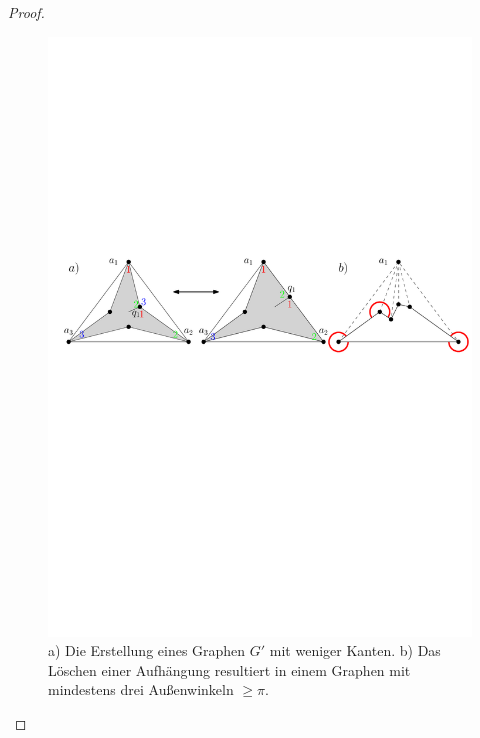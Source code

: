 \begin{proof}
\begin{figure}
	\centering
	  \includegraphics[width=1\textwidth]{lem6_1.pdf}
    	\caption{a) Die Erstellung eines Graphen $G'$ mit weniger Kanten. b) Das Löschen einer Aufhängung resultiert in einem Graphen mit mindestens drei Außenwinkeln $\geq \pi$.}
    	\label{pic_lem6_1}
\end{figure}


\end{proof}

